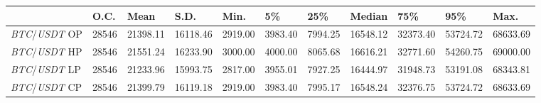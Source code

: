 \begin{tabular}{lllllllllll}
\toprule
 & \textbf{O.C.} & \textbf{Mean} & \textbf{S.D.} & \textbf{Min.} & \textbf{5\%} & \textbf{25\%} & \textbf{Median} & \textbf{75\%} & \textbf{95\%} & \textbf{Max.} \\
\midrule
\emph{BTC}/\emph{USDT} OP & 28546 & 21398.11 & 16118.46 & 2919.00 & 3983.40 & 7994.25 & 16548.12 & 32373.40 & 53724.72 & 68633.69 \\
\emph{BTC}/\emph{USDT} HP & 28546 & 21551.24 & 16233.90 & 3000.00 & 4000.00 & 8065.68 & 16616.21 & 32771.60 & 54260.75 & 69000.00 \\
\emph{BTC}/\emph{USDT} LP & 28546 & 21233.96 & 15993.75 & 2817.00 & 3955.01 & 7927.25 & 16444.97 & 31948.73 & 53191.08 & 68343.81 \\
\emph{BTC}/\emph{USDT} CP & 28546 & 21399.79 & 16119.18 & 2919.00 & 3983.40 & 7995.17 & 16548.24 & 32376.75 & 53724.72 & 68633.69 \\
\bottomrule
\end{tabular}
